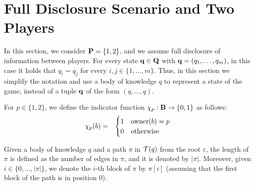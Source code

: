 

\section{Full Disclosure Scenario and Two Players}
\label{sec-fd&2p}
In this section, we consider $\mathbf{P} = \{1,2\}$, and we assume full disclosure of information between players.
For every state $\mathbf{q} \in \mathbf{Q}$ with $\mathbf{q} = (q_1, \ldots, q_m)$, in this case it holds that $q_i = q_j$ for every $i,j \in \{1, \ldots, m\}$. Thus, in this section we simplify the notation and use a body of knowledge $q$ to represent a state of the game, instead of a tuple $\mathbf{q}$ of the form $(q, \ldots, q)$.

For $p \in \{1,2\}$, we define the indicator  function $\chi_p : \mathbf{B} \to \{0,1\}$ as follows:
\begin{eqnarray*}
\chi_p(b) & = & 
\begin{cases}
1 & \text{\rm owner}(b) = p\\
0 & \text{otherwise}
\end{cases}
\end{eqnarray*}

Given a body of knowledge $q$ and a path $\pi$ in $\mathcal{T}(q)$ from the root $\varepsilon$, the length of $\pi$ is defined as the number of edges in $\pi$, and it is denoted by $|\pi|$. Moreover, given $i \in \{0, \ldots, |\pi|\}$, we denote the $i$-th block of
 $\pi$ by $\pi[i]$ (assuming that the first block of the path is in position 0). 
 
